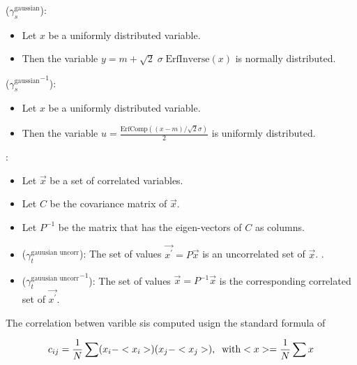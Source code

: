 \vspace{1cm}


 ($\gamma_s^{\text{gaussian}}$):
\begin{center}
\begin{itemize}
\item Let $x$ be a uniformly distributed variable.
\item Then the variable $y=m + \sqrt{2} \; \sigma \; \text{ErfInverse}(x)$ is normally distributed.
\end{itemize}
\end{center}

 (${\gamma_s^{\text{gaussian}}}^{-1}$):
\begin{center}
\begin{itemize}
\item Let $x$ be a uniformly distributed variable.
\item Then the variable $u= \frac{\text{ErfComp}\left( (x - m)/\sqrt{2}\sigma \right)}{2}$ is uniformly distributed.
\end{itemize}
\end{center}


\vspace{1cm}


:
\begin{center}
\begin{itemize}
\item Let $\vec{x}$ be a set of correlated variables.
\item Let $C$ be the covariance matrix of $\vec{x}$.
\item Let $P^{-1}$ be the matrix that has the eigen-vectors of $C$ as columns.
\item ($\gamma_t^{\text{gauusian uncorr}}$): The set of values $\vec{x^\prime} = P\vec{x}$ is an uncorrelated set of $\vec{x}$. .
\item (${\gamma_t^{\text{gauusian uncorr}}}^{-1}$): The set of values $\vec{x} = P^{-1}\vec{x}$ is the corresponding correlated set of $\vec{x^{\prime}}$.
\end{itemize}
\end{center}

\noindent The correlation betwen varible sis computed usign the standard formula of 

\begin{equation}
\centering
c_{ij} = \frac{1}{N} \sum (x_i-<x_i>)(x_j-<x_j>), \;\; \text {with} <x> = \frac{1}{N} \sum x \nonumber
\label{hor_reww_correlation_formula}
\end{equation}


